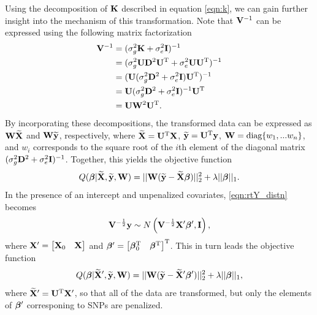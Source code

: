 Using the decomposition of $\mathbf{K}$ described in equation \eqref{eqn:k}, we can gain further insight into the mechanism of this transformation. Note that $\mathbf{V}^{-1}$ can be expressed using the following matrix factorization 
\begin{align*}
    \mathbf{V}^{-1} &= (\sigma^2_g \mathbf{K} + \sigma^2_e \mathbf{I})^{-1}\\
    &=(\sigma^2_g \mathbf{U} \mathbf{D}^2 \mathbf{U}^{\text{T}} + \sigma^2_e \mathbf{U} \mathbf{U}^{\text{T}})^{-1}\\
    &= (\mathbf{U} (\sigma^2_g \mathbf{D}^2 + \sigma^2_e \mathbf{I}) \mathbf{U}^{\text{T}})^{-1}\\
    &=\mathbf{U} (\sigma^2_g \mathbf{D}^2 + \sigma^2_e \mathbf{I})^{-1} \mathbf{U}^{\text{T}}\\
    &=\mathbf{U} \mathbf{W}^2 \mathbf{U}^{\text{T}}.
\end{align*}
By incorporating these decompositions, the transformed data can be expressed as $\mathbf{W} \widetilde{\mathbf{X}}$ and $\mathbf{W} \widetilde{\mathbf{y}}$, respectively, where $\widetilde{\mathbf{X}} = \mathbf{U}^{\text{T}} \mathbf{X}$, $\widetilde{\mathbf{y}} = \mathbf{U}^{\text{T}} \mathbf{y}$, $\mathbf{W} = \text{diag}\{w_1, ... w_n\}$, and $w_i$ corresponds to the square root of the $i$th element of the diagonal matrix $(\sigma^2_g \mathbf{D}^2 + \sigma^2_e \mathbf{I})^{-1}$. Together, this yields the objective function
\begin{equation}
\label{eqn:lmm_obj}
Q(\boldsymbol{\beta}{} | \widetilde{\mathbf{X}}, \widetilde{\mathbf{y}}, \mathbf{W}) = || \mathbf{W} (\widetilde{\mathbf{y}} - \widetilde{\mathbf{X}} \boldsymbol{\beta}{})||_2^2 + \lambda || \boldsymbol{\beta}{} ||_1.
\end{equation}
In the presence of an intercept and unpenalized covariates, \eqref{eqn:rtY_distn} becomes 
\begin{equation}
\mathbf{V}^{-\frac{1}{2}}\mathbf{y} \sim N\left(\mathbf{V}^{-\frac{1}{2}} \mathbf{X}{^\prime} \boldsymbol{\beta}{}{^\prime}, \mathbf{I} \right),
\end{equation}
where $\mathbf{X}{^\prime} = \begin{bmatrix} \mathbf{X}_0 & \mathbf{X} \end{bmatrix}$ and $\boldsymbol{\beta}{}{^\prime} = \begin{bmatrix} \boldsymbol{\beta}{}_0^{\text{T}} & \boldsymbol{\beta}{}^{\text{T}} \end{bmatrix}^{\text{T}}$. This in turn leads the objective function
\begin{equation}
Q(\boldsymbol{\beta}{} | \widetilde{\mathbf{X}}{^\prime}, \widetilde{\mathbf{y}}, \mathbf{W}) = || \mathbf{W} (\widetilde{\mathbf{y}} - \widetilde{\mathbf{X}}{^\prime} \boldsymbol{\beta}{}{^\prime})||_2^2 + \lambda || \boldsymbol{\beta}{} ||_1,
\end{equation}
where $\widetilde{\mathbf{X}}{^\prime} = \mathbf{U}^{\text{T}} \mathbf{X}{^\prime}$, so that all of the data are transformed, but only the elements of $\boldsymbol{\beta}{}{^\prime}$ corresponing to SNPs are penalized. 


